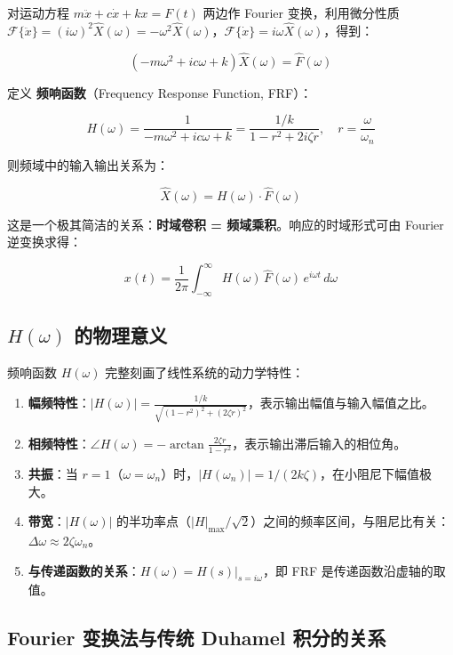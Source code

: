 对运动方程 $m\ddot{x} + c\dot{x} + kx = F(t)$ 两边作 Fourier 变换，利用微分性质 $\mathcal{F}\{\ddot{x}\} = (i\omega)^2\hat{X}(\omega) = -\omega^2\hat{X}(\omega)$，$\mathcal{F}\{\dot{x}\} = i\omega\hat{X}(\omega)$，得到：

\[
(-m\omega^2 + ic\omega + k) \hat{X}(\omega) = \hat{F}(\omega)
\]

定义 \textbf{频响函数}（Frequency Response Function, FRF）：

\begin{myformula}
\[
H(\omega) = \frac{1}{-m\omega^2 + ic\omega + k} = \frac{1/k}{1 - r^2 + 2i\zeta r},\quad r = \frac{\omega}{\omega_n}
\]
\end{myformula}

则频域中的输入输出关系为：

\begin{myformula}
\[
\hat{X}(\omega) = H(\omega) \cdot \hat{F}(\omega)
\]
\end{myformula}

这是一个极其简洁的关系：\textbf{时域卷积 = 频域乘积}。响应的时域形式可由 Fourier 逆变换求得：

\[
x(t) = \frac{1}{2\pi} \int_{-\infty}^{\infty} H(\omega)\,\hat{F}(\omega)\, e^{i\omega t}\,d\omega
\]

\subsection{$H(\omega)$ 的物理意义}

频响函数 $H(\omega)$ 完整刻画了线性系统的动力学特性：

\begin{enumerate}
\item \textbf{幅频特性}：$|H(\omega)| = \frac{1/k}{\sqrt{(1-r^2)^2 + (2\zeta r)^2}}$，表示输出幅值与输入幅值之比。
\item \textbf{相频特性}：$\angle H(\omega) = -\arctan\frac{2\zeta r}{1-r^2}$，表示输出滞后输入的相位角。
\item \textbf{共振}：当 $r=1$（$\omega = \omega_n$）时，$|H(\omega_n)| = 1/(2k\zeta)$，在小阻尼下幅值极大。
\item \textbf{带宽}：$|H(\omega)|$ 的半功率点（$|H|_{\max}/\sqrt{2}$）之间的频率区间，与阻尼比有关：$\Delta\omega \approx 2\zeta\omega_n$。
\item \textbf{与传递函数的关系}：$H(\omega) = H(s)\big|_{s=i\omega}$，即 FRF 是传递函数沿虚轴的取值。
\end{enumerate}

\subsection{Fourier 变换法与传统 Duhamel 积分的关系}

